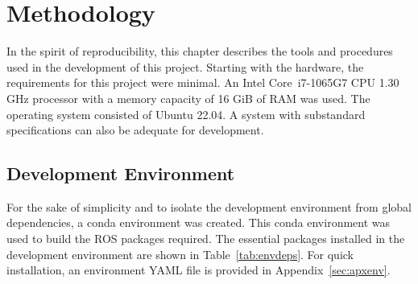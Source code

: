 \chapter{Methodology}\label{cha:methodology}

    In the spirit of reproducibility, this chapter describes the tools and procedures used in the development of this project. Starting with the hardware, the requirements for this project were minimal. An Intel\textsuperscript{\textregistered} Core\texttrademark\ i7-1065G7 CPU 1.30 GHz processor with a memory capacity of 16 GiB of RAM was used. The operating system consisted of Ubuntu 22.04. A system with substandard specifications can also be adequate for development.

\section{Development Environment}

    For the sake of simplicity and to isolate the development environment from global dependencies, a \textsf{conda} environment was created. This \textsf{conda} environment was used to build the \ac{ROS} packages required. The essential packages installed in the development environment are shown in Table~\ref{tab:envdeps}. For quick installation, an environment \ac{YAML} file is provided in Appendix~\ref{sec:apxenv}.

